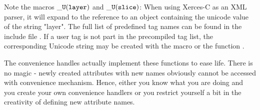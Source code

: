 \documentclass[10pt,a4paper]{article}
\begin{document}
\noindent
Note the macros $\tt{\_U(layer)}$ and $\tt{\_U(slice)}$: 
When using Xerces-C as an XML parser, 
it will expand to the reference to an object containing the unicode value 
of the string "layer". The full list of predefined tag names can be found in the
include file .
If a user tag is not part in the precompiled tag list, the corresponding Unicode
string may be created with the macro  or the function
.

\noindent
The convenience handles actually implement
these functions to ease life. There is no magic - newly created attributes
with new names obviously cannot be accessed with convenience mechanism.
Hence, either you know what you are doing and you create your own 
convenience handlers or you restrict yourself a bit in the creativity
of defining new attribute names.
\end{document}
